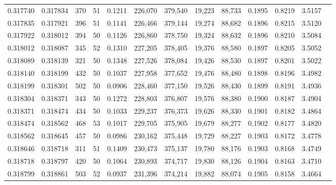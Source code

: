 \begin{tabular}{rrrrrrrrrrrrr}
0.317740 & 0.317834 &   370 &  51 &                                     0.1211 & 226,070 & 379,540 &  19,223 &  88,733 & 0.1895 & 0.8219 & 3.5157 \\
0.317835 & 0.317921 &   396 &  51 &                                     0.1141 & 226,466 & 379,144 &  19,274 &  88,682 & 0.1896 & 0.8215 & 3.5120 \\
0.317922 & 0.318012 &   394 &  50 &                                     0.1126 & 226,860 & 378,750 &  19,324 &  88,632 & 0.1896 & 0.8210 & 3.5084 \\
0.318012 & 0.318087 &   345 &  52 &                                     0.1310 & 227,205 & 378,405 &  19,376 &  88,580 & 0.1897 & 0.8205 & 3.5052 \\
0.318089 & 0.318139 &   321 &  50 &                                     0.1348 & 227,526 & 378,084 &  19,426 &  88,530 & 0.1897 & 0.8201 & 3.5022 \\
0.318140 & 0.318199 &   432 &  50 &                                     0.1037 & 227,958 & 377,652 &  19,476 &  88,480 & 0.1898 & 0.8196 & 3.4982 \\
0.318199 & 0.318301 &   502 &  50 &                                     0.0906 & 228,460 & 377,150 &  19,526 &  88,430 & 0.1899 & 0.8191 & 3.4936 \\
0.318304 & 0.318371 &   343 &  50 &                                     0.1272 & 228,803 & 376,807 &  19,576 &  88,380 & 0.1900 & 0.8187 & 3.4904 \\
0.318371 & 0.318474 &   434 &  50 &                                     0.1033 & 229,237 & 376,373 &  19,626 &  88,330 & 0.1901 & 0.8182 & 3.4864 \\
0.318474 & 0.318562 &   468 &  53 &                                     0.1017 & 229,705 & 375,905 &  19,679 &  88,277 & 0.1902 & 0.8177 & 3.4820 \\
0.318562 & 0.318645 &   457 &  50 &                                     0.0986 & 230,162 & 375,448 &  19,729 &  88,227 & 0.1903 & 0.8172 & 3.4778 \\
0.318646 & 0.318718 &   311 &  51 &                                     0.1409 & 230,473 & 375,137 &  19,780 &  88,176 & 0.1903 & 0.8168 & 3.4749 \\
0.318718 & 0.318797 &   420 &  50 &                                     0.1064 & 230,893 & 374,717 &  19,830 &  88,126 & 0.1904 & 0.8163 & 3.4710 \\
0.318799 & 0.318861 &   503 &  52 &                                     0.0937 & 231,396 & 374,214 &  19,882 &  88,074 & 0.1905 & 0.8158 & 3.4664 \\

\end{tabular}
